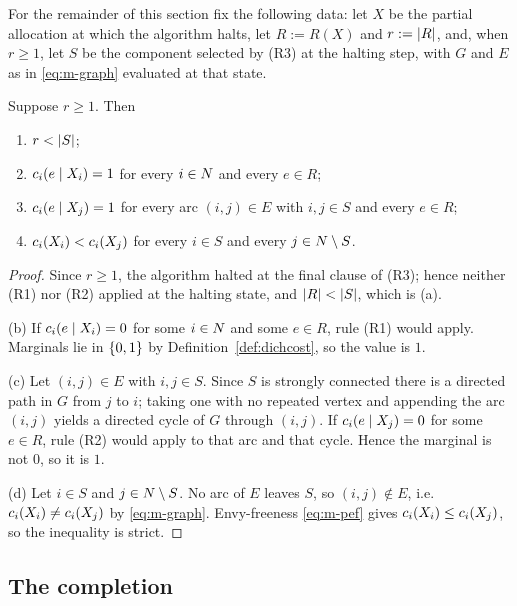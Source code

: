 For the remainder of this section fix the following data: let $X$ be the
partial allocation at which the algorithm halts, let $R := R(X)$ and
$r := \left\lvert R\right\rvert$, and, when $r \ge 1$, let $S$ be the component selected by (R3)
at the halting step, with $G$ and $E$ as in \eqref{eq:m-graph} evaluated at
that state.

\begin{lemma}
\label{lem:m-terminal}
Suppose $r \ge 1$. Then
\begin{enumerate}
  \item[(a)] $r < \left\lvert S\right\rvert$;
  \item[(b)] $c_i(e \mid X_i) = 1$ for every $i \in N$ and every
        $e \in R$;
  \item[(c)] $c_i(e \mid X_j) = 1$ for every arc $(i,j) \in E$ with
        $i,j \in S$ and every $e \in R$;
  \item[(d)] $c_i(X_i) < c_i(X_j)$ for every $i \in S$ and every
        $j \in N \setminus S$.
\end{enumerate}
\end{lemma}

\begin{proof}
Since $r \ge 1$, the algorithm halted at the final clause of (R3); hence
neither (R1) nor (R2) applied at the halting state, and $\left\lvert R\right\rvert < \left\lvert S\right\rvert$,
which is (a).

(b) If $c_i(e \mid X_i) = 0$ for some $i \in N$ and some $e \in R$,
rule (R1) would apply. Marginals lie in $\left\{0,1\right\}$ by
Definition~\ref{def:dichcost}, so the value is $1$.

(c) Let $(i,j) \in E$ with $i,j \in S$. Since $S$ is strongly connected there
is a directed path in $G$ from $j$ to $i$; taking one with no repeated vertex
and appending the arc $(i,j)$ yields a directed cycle of $G$ through $(i,j)$.
If $c_i(e \mid X_j) = 0$ for some $e \in R$, rule (R2) would apply to that
arc and that cycle. Hence the marginal is not $0$, so it is $1$.

(d) Let $i \in S$ and $j \in N \setminus S$. No arc of $E$ leaves $S$, so
$(i,j) \notin E$, i.e.\ $c_i(X_i) \ne c_i(X_j)$ by \eqref{eq:m-graph}.
Envy-freeness \eqref{eq:m-pef} gives $c_i(X_i) \le c_i(X_j)$, so the
inequality is strict.
\end{proof}

\subsection{The completion}
\label{sec:m-completion}

